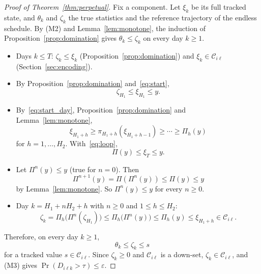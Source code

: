 \documentclass[11pt,a4paper]{article}
\theoremstyle{plain}
\theoremstyle{definition}
\theoremstyle{remark}
\begin{document}
\label{prf:thm:perpetual}
\begin{proof}[Proof of Theorem~\ref{thm:perpetual}]
Fix a component.
Let $\xi_k$ be its full tracked state, and $\theta_k$ and $\zeta_k$ the true statistics and the reference trajectory of the endless schedule.
By (M2) and Lemma~\ref{lem:monotone}, the induction of Proposition~\ref{prop:domination} gives $\theta_k \le \zeta_k$ on every day $k \ge 1$.
\begin{itemize}
  \item Days $k \le T$: $\zeta_k \le \xi_k$ (Proposition~\ref{prop:domination}) and $\xi_k \in \mathcal{C}_{i\ell}$ (Section~\ref{sec:encoding}).
  \item By Proposition~\ref{prop:domination} and~\eqref{eq:start},
    \begin{equation}
      \zeta_{H_1} \le \xi_{H_1} \le y.
    \end{equation}
  \item By~\eqref{eq:start_day}, Proposition~\ref{prop:domination} and Lemma~\ref{lem:monotone},
    \begin{equation}
      \xi_{H_1+h} \ge \pi_{H_1+h}(\xi_{H_1+h-1}) \ge \cdots \ge \Pi_h(y)
    \end{equation}
    for $h = 1, \ldots, H_2$.
    With~\eqref{eq:loop},
    \begin{equation}
      \Pi(y) \le \xi_T \le y.
    \end{equation}
  \item Let $\Pi^n(y) \le y$ (true for $n = 0$).
    Then
    \begin{equation}
      \Pi^{n+1}(y) = \Pi(\Pi^n(y)) \le \Pi(y) \le y
    \end{equation}
    by Lemma~\ref{lem:monotone}.
    So $\Pi^n(y) \le y$ for every $n \ge 0$.
  \item Day $k = H_1 + n H_2 + h$ with $n \ge 0$ and $1 \le h \le H_2$:
    \begin{equation}
      \zeta_k = \Pi_h\bigl(\Pi^n(\zeta_{H_1})\bigr)
      \le \Pi_h\bigl(\Pi^n(y)\bigr)
      \le \Pi_h(y)
      \le \xi_{H_1+h} \in \mathcal{C}_{i\ell}.
    \end{equation}
\end{itemize}
Therefore, on every day $k \ge 1$,
\begin{equation}
  \theta_k \le \zeta_k \le s
\end{equation}
for a tracked value $s \in \mathcal{C}_{i\ell}$.
Since $\zeta_k \ge 0$ and $\mathcal{C}_{i\ell}$ is a down-set, $\zeta_k \in \mathcal{C}_{i\ell}$, and (M3) gives $\Pr(D_{i\ell k} > \tau) \le \varepsilon$.
\end{proof}
\end{document}
